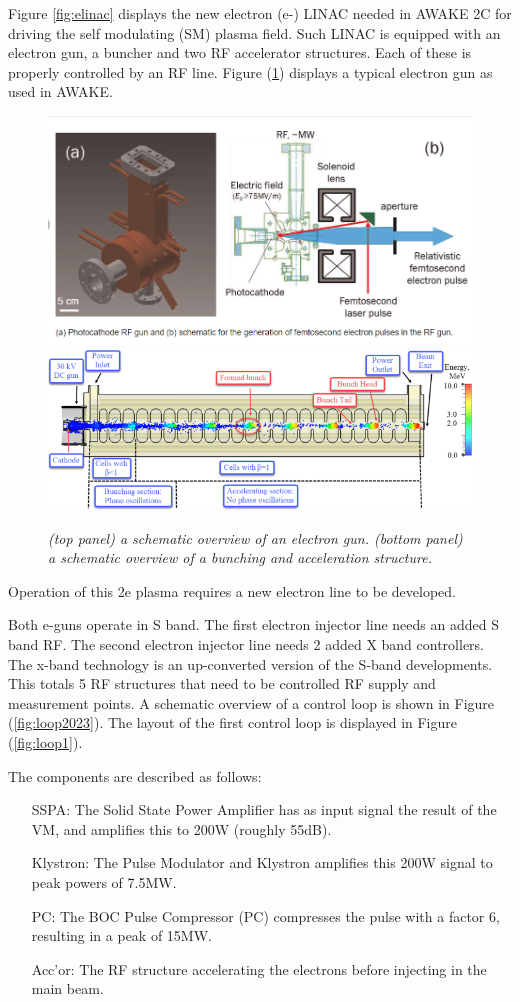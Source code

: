 \documentclass[12pt]{amsart}
\begin{document}
Figure \ref{fig:elinac} displays the new electron (e-) LINAC needed in AWAKE 2C for driving the self modulating (SM) plasma field.
Such LINAC is equipped with an electron gun, a buncher and two RF accelerator structures.
Each of these is properly controlled by an RF line.
Figure (\ref{fig:run2c.egun}) displays a typical electron gun as used in AWAKE.
\begin{figure}[htbp] %
   \centering
   \includegraphics[width=5in]{im/egun.png} 
   \includegraphics[width=5in]{im/eacc.png} 
   \caption{\em  (top panel) a schematic overview of an electron gun.
   			(bottom panel) a schematic overview of a bunching and acceleration structure.
			}
   \label{fig:run2c.egun}
\end{figure}
Operation of this 2e plasma requires a new electron line to be developed.


Both e-guns operate in S band.
The first electron injector line needs an added S band RF.
The second electron injector line needs 2 added X band controllers.
The x-band technology is an up-converted version of the S-band developments.
This totals 5 RF structures that need to be controlled RF supply and measurement points.
A schematic overview of a control loop is shown in Figure (\ref{fig:loop2023}).
The layout of the first control loop is displayed in Figure (\ref{fig:loop1}).

The components are described as follows:
\begin{itemize}
\item[SSPA:] The Solid State Power Amplifier has as input signal the result of the VM, and amplifies this to 200W (roughly 55dB). 
\item[Klystron:] The Pulse Modulator and Klystron amplifies this 200W signal to peak powers of 7.5MW.
\item[PC:] The BOC Pulse Compressor (PC) compresses the pulse with a factor 6, resulting in a peak of 15MW.
\item[Acc'or:] The RF structure accelerating the electrons before injecting in the main beam.
\end{itemize}
\end{document}
